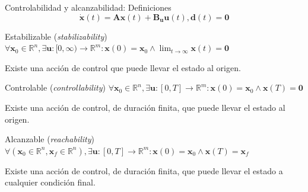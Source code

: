 \documentclass{beamer}
\begin{document}
\begin{frame}{Controlabilidad y alcanzabilidad: Definiciones}
    $$\dot{\mathbf{x}}(t)=\mathbf{A}\mathbf{x}(t) + \mathbf{B_u}\mathbf{u}(t), \mathbf{d}(t) = \mathbf{0}$$

    \begin{block}{Estabilizable (\emph{stabilizability})}
        $\forall \mathbf{x}_0 \in \mathbb{R}^n, \exists \mathbf{u}: [0, \infty) \rightarrow \mathbb{R}^m: \mathbf{x}(0) = \mathbf{x}_0 \land \lim_{t \rightarrow \infty}{\mathbf{x}(t)}=\mathbf{0}$
        
        Existe una acción de control que puede llevar el estado al origen.
    \end{block}
    
    \begin{block}{Controlable (\emph{controllability})}
        $\forall \mathbf{x}_0 \in \mathbb{R}^n, \exists \mathbf{u}: [0, T] \rightarrow \mathbb{R}^m: \mathbf{x}(0) = \mathbf{x}_0 \land \mathbf{x}(T)=\mathbf{0}$
        
        Existe una acción de control, de duración finita, que puede llevar el estado al origen.
    \end{block}
    
    \begin{block}{Alcanzable (\emph{reachability})}
        $\forall (\mathbf{x}_0 \in \mathbb{R}^n, \mathbf{x}_f \in \mathbb{R}^n), \exists \mathbf{u}: [0, T] \rightarrow \mathbb{R}^m: \mathbf{x}(0) = \mathbf{x}_0 \land \mathbf{x}(T)=\mathbf{x}_f$
        
        Existe una acción de control, de duración finita, que puede llevar el estado a cualquier condición final.
    \end{block}

\end{frame}
\end{document}
